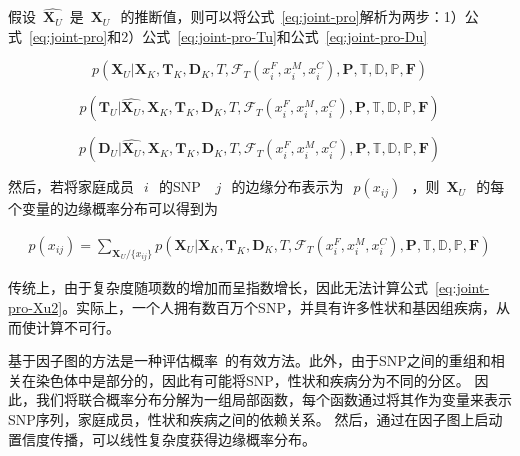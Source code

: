 假设~$\hat{\mathbf{X}_U}$~是~$\mathbf{X}_U~$~的推断值，则可以将公式~\ref{eq:joint-pro}解析为两步：1）公式~\ref{eq:joint-pro}和2）公式~\ref{eq:joint-pro-Tu}和公式~\ref{eq:joint-pro-Du}

\begin{equation}\label{eq:joint-pro-Xu}
p(\mathbf{X}_U | \mathbf{X}_K, \mathbf{T}_K, \mathbf{D}_K, T, \mathcal{F}_T(x_i^F,x_i^M,x_i^C), \mathbf{P}, \mathbb{T}, \mathbb{D}, \mathbb{P}, \mathbf{F})
\end{equation}

\begin{equation}\label{eq:joint-pro-Tu}
p(\mathbf{T}_U |\hat{\mathbf{X}_U}, \mathbf{X}_K, \mathbf{T}_K, \mathbf{D}_K, T, \mathcal{F}_T(x_i^F,x_i^M,x_i^C), \mathbf{P}, \mathbb{T}, \mathbb{D}, \mathbb{P}, \mathbf{F})
\end{equation}

\begin{equation}\label{eq:joint-pro-Du}
p(\mathbf{D}_U |\hat{\mathbf{X}_U}, \mathbf{X}_K, \mathbf{T}_K, \mathbf{D}_K, T, \mathcal{F}_T(x_i^F,x_i^M,x_i^C), \mathbf{P}, \mathbb{T}, \mathbb{D}, \mathbb{P}, \mathbf{F})
\end{equation}


然后，若将家庭成员~$~i~$~的SNP ~$~j~$~的边缘分布表示为~$~p(x_{ij})~$~，则~$\mathbf{X}_U~$~的每个变量的边缘概率分布可以得到为

\begin{equation}\label{eq:joint-pro-Xu2}
\begin{aligned}
p(x_{ij})= \sum_{\mathbf{X}_U/\{x_{ij}\}} p(\mathbf{X}_U | \mathbf{X}_K, \mathbf{T}_K, \mathbf{D}_K, T,  \mathcal{F}_T(x_i^F,x_i^M,x_i^C), \mathbf{P}, \mathbb{T}, \mathbb{D}, \mathbb{P}, \mathbf{F})
\end{aligned}
\end{equation}


传统上，由于复杂度随项数的增加而呈指数增长，因此无法计算公式~\ref{eq:joint-pro-Xu2}。实际上，一个人拥有数百万个SNP，并具有许多性状和基因组疾病，从而使计算不可行。


基于因子图的方法是一种评估概率~\cite{kschischang2001factor}的有效方法。此外，由于SNP之间的重组和相关在染色体中是部分的，因此有可能将SNP，性状和疾病分为不同的分区。 因此，我们将联合概率分布分解为一组局部函数，每个函数通过将其作为变量来表示SNP序列，家庭成员，性状和疾病之间的依赖关系。 然后，通过在因子图上启动置信度传播，可以线性复杂度获得边缘概率分布。


